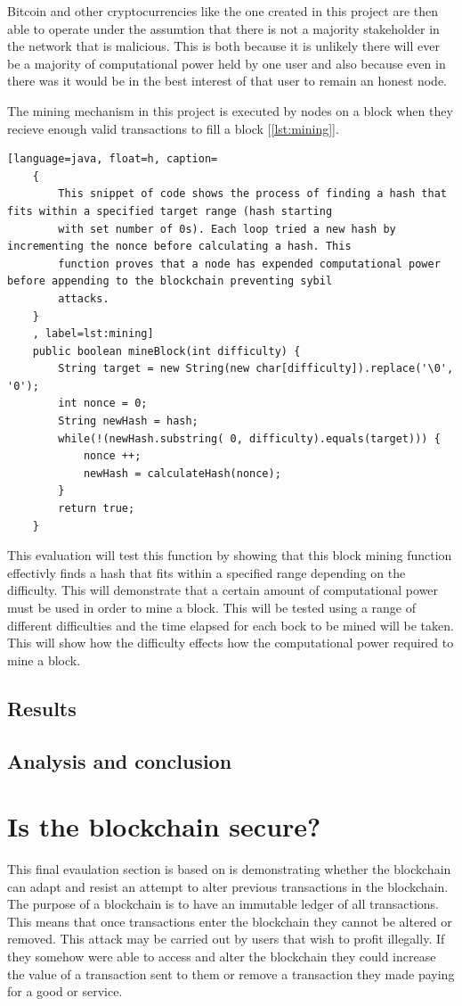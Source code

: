 \documentclass{l4proj}
\begin{document}
Bitcoin and other cryptocurrencies like the one created in this project are then able to operate under the assumtion
that there is not a majority stakeholder in the network that is malicious. This is both because it is unlikely there will
ever be a majority of computational power held by one user and also because even in there was it would be in the best 
interest of that user to remain an honest node.

The mining mechanism in this project is executed by nodes on a block when they recieve enough valid transactions to
fill a block [\ref{lst:mining}].

\begin{lstlisting}[language=java, float=h, caption=
    {
        This snippet of code shows the process of finding a hash that fits within a specified target range (hash starting
        with set number of 0s). Each loop tried a new hash by incrementing the nonce before calculating a hash. This 
        function proves that a node has expended computational power before appending to the blockchain preventing sybil
        attacks.
    }
    , label=lst:mining]
    public boolean mineBlock(int difficulty) {
        String target = new String(new char[difficulty]).replace('\0', '0');
        int nonce = 0; 
        String newHash = hash;
		while(!(newHash.substring( 0, difficulty).equals(target))) {
            nonce ++;
			newHash = calculateHash(nonce);
        }
        return true;
    }
\end{lstlisting}

This evaluation will test this function by showing that this block mining function effectivly finds a hash that fits 
within a specified range depending on the difficulty. This will demonstrate that a certain amount of computational
power must be used in order to mine a block. This will be tested using a range of different difficulties and the time
elapsed for each bock to be mined will be taken. This will show how the difficulty effects how the computational power 
required to mine a block.

\subsection{Results}
\subsection{Analysis and conclusion}

\section{Is the blockchain secure?}
This final evaulation section is based on is demonstrating whether the blockchain can adapt and resist an attempt to 
alter previous transactions in the blockchain. The purpose of a blockchain is to have an immutable ledger of all transactions.
This means that once transactions enter the blockchain they cannot be altered or removed. This attack may be carried out
by users that wish to profit illegally. If they somehow were able to access and alter the blockchain they could increase
the value of a transaction sent to them or remove a transaction they made paying for a good or service.
\end{document}
